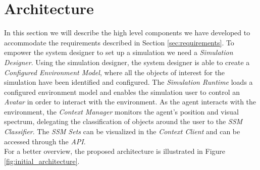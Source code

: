 \section{Architecture} %
\label{sec:architecture}
In this section we will describe the high level components we have developed to accommodate the requirements described in Section \ref{sec:requirements}. To empower the system designer to set up a simulation we need a \emph{Simulation Designer}. Using the simulation designer, the system designer is able to create a \emph{Configured Environment Model}, where all the objects of interest for the simulation have been identified and configured. The \emph{Simulation Runtime} loads a configured environment model and enables the simulation user to control an \emph{Avatar} in order to interact with the environment. As the agent interacts with the environment, the \emph{Context Manager} monitors the agent's position and visual spectrum, delegating the classification of objects around the user to the \emph{SSM Classifier}. The \emph{SSM Sets} can be visualized in the \emph{Context Client} and can be accessed through the \emph{API}.\\

For a better overview, the proposed architecture is illustrated in Figure \ref{fig:initial_architecture}.

